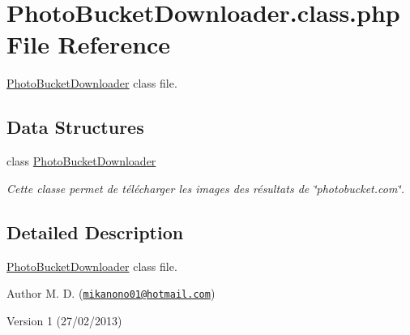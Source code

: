 \hypertarget{_photo_bucket_downloader_8class_8php}{\section{Photo\-Bucket\-Downloader.\-class.\-php File Reference}
\label{_photo_bucket_downloader_8class_8php}
}


\hyperlink{class_photo_bucket_downloader}{Photo\-Bucket\-Downloader} class file.  


\subsection*{Data Structures}
\begin{DoxyCompactItemize}
\item 
class \hyperlink{class_photo_bucket_downloader}{Photo\-Bucket\-Downloader}
\begin{DoxyCompactList}\small\item\em Cette classe permet de télécharger les images des résultats de \char`\"{}photobucket.\-com\char`\"{}. \end{DoxyCompactList}\end{DoxyCompactItemize}


\subsection{Detailed Description}
\hyperlink{class_photo_bucket_downloader}{Photo\-Bucket\-Downloader} class file. \begin{DoxyAuthor}{Author}
M. D. (\href{mailto:mikanono01@hotmail.com}{\tt mikanono01@hotmail.\-com}) 
\end{DoxyAuthor}
\begin{DoxyVersion}{Version}
1 (27/02/2013) 
\end{DoxyVersion}
